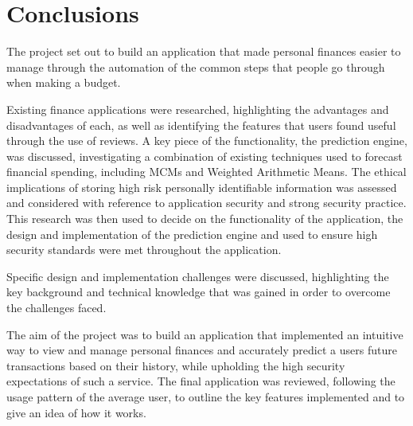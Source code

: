 \chapter{Conclusions}
\label{cha:conclusions}

\begin{comment}
Chapter 7: Conclusions
This can be a short chapter summarizing what you have achieved and what you have learned from the achievement. It is different from the abstract. The main results of your work should be highlighted with a critical appraisal of them indicating the extent to which the objectives outlined in Chapter 1 have been met. Exaggerated claims are counterproductive here. Recommendations for further activity are often included in this chapter.
\end{comment}

The project set out to build an application that made personal finances easier to manage through the automation of the common steps that people go through when making a budget.

Existing finance applications were researched, highlighting the advantages and disadvantages of each, as well as identifying the features that users found useful through the use of reviews.
%
A key piece of the functionality, the prediction engine, was discussed, investigating a combination of existing techniques used to forecast financial spending, including MCMs and Weighted Arithmetic Means. 
%
The ethical implications of storing high risk personally identifiable information was assessed and considered with reference to application security and strong security practice.
%
This research was then used to decide on the functionality of the application, the design and implementation of the prediction engine and used to ensure high security standards were met throughout the application.

Specific design and implementation challenges were discussed, highlighting the key background and technical knowledge that was gained in order to overcome the challenges faced.

The aim of the project was to build an application that implemented an intuitive way to view and manage personal finances and accurately predict a users future \glspl{transaction} based on their history, while upholding the high security expectations of such a service.
%
The final application was reviewed, following the usage pattern of the average user, to outline the key features implemented and to give an idea of how it works.

